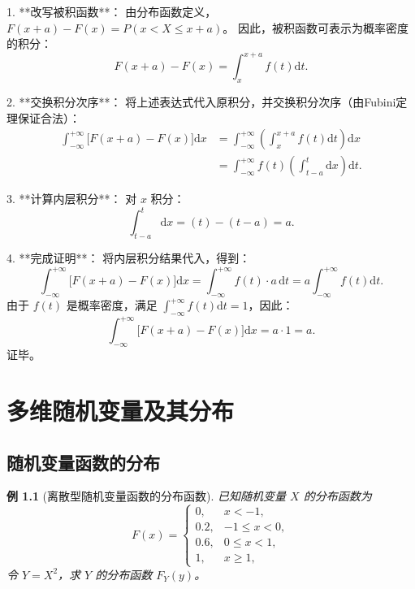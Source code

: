 \documentclass{book}
\newtheorem{example}{例}[subsection]
\begin{document}
1.  **改写被积函数**：
    由分布函数定义，$F(x+a) - F(x) = P(x < X \le x+a)$。
    因此，被积函数可表示为概率密度的积分：
    \[
    F(x+a) - F(x) = \int_{x}^{x+a} f(t) \mathrm{d}t.
    \]

2.  **交换积分次序**：
    将上述表达式代入原积分，并交换积分次序（由Fubini定理保证合法）：
    \[
    \begin{aligned}
    \int_{-\infty}^{+\infty} \bigl[F(x+a) - F(x)\bigr] \mathrm{d}x
    &= \int_{-\infty}^{+\infty} \left( \int_{x}^{x+a} f(t) \mathrm{d}t \right) \mathrm{d}x \\
    &= \int_{-\infty}^{+\infty} f(t) \left( \int_{t-a}^{t} \mathrm{d}x \right) \mathrm{d}t.
    \end{aligned}
    \]

3.  **计算内层积分**：
    对 $x$ 积分：
    \[
    \int_{t-a}^{t} \mathrm{d}x = (t) - (t-a) = a.
    \]

4.  **完成证明**：
    将内层积分结果代入，得到：
    \[
    \int_{-\infty}^{+\infty} \bigl[F(x+a) - F(x)\bigr] \mathrm{d}x
    = \int_{-\infty}^{+\infty} f(t) \cdot a \, \mathrm{d}t
    = a \int_{-\infty}^{+\infty} f(t) \mathrm{d}t.
    \]
    由于 $f(t)$ 是概率密度，满足 $\int_{-\infty}^{+\infty} f(t) \mathrm{d}t = 1$，因此：
    \[
    \int_{-\infty}^{+\infty} \bigl[F(x+a) - F(x)\bigr] \mathrm{d}x = a \cdot 1 = a.
    \]
    证毕。


\chapter{多维随机变量及其分布}
\section{随机变量函数的分布}

\begin{example}[离散型随机变量函数的分布函数]
已知随机变量 $X$ 的分布函数为
\[
F(x) =
\begin{cases}
0, & x < -1, \\
0.2, & -1 \le x < 0, \\
0.6, & 0 \le x < 1, \\
1, & x \ge 1,
\end{cases}
\]
令 $Y = X^2$，求 $Y$ 的分布函数 $F_Y(y)$。
\end{example}
\end{document}
